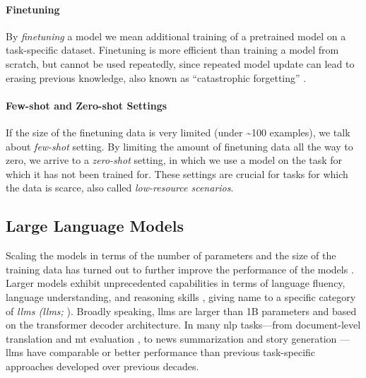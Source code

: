 {\begin{figure}[t]
\end{figure}

\paragraph{Finetuning} By \emph{finetuning} a model we mean additional training of a pretrained model on a task-specific dataset. Finetuning is more efficient than training a model from scratch, but cannot be used repeatedly, since repeated model update can lead to erasing previous knowledge, also known as ``catastrophic forgetting'' \cite{mccloskey1989catastrophic,kirkpatrick2017overcoming}.


\paragraph{Few-shot and Zero-shot Settings} If the size of the finetuning data is very limited (under \textasciitilde 100 examples), we talk about \emph{few-shot} setting. By limiting the amount of finetuning data all the way to zero, we arrive to a \emph{zero-shot} setting, in which we use a model on the task for which it has not been trained for. These settings are crucial for tasks for which the data is scarce, also called \emph{low-resource scenarios}.

\subsection{Large Language Models}
\label{sec:llms}
Scaling the models in terms of the number of parameters and the size of the training data has turned out to further improve the performance of the models \cite{kaplan2020scaling,hoffmann2022training}. Larger models exhibit unprecedented capabilities in terms of language fluency, language understanding, and reasoning skills \cite{wei2022emergent,bubeck2023sparks}, giving name to a specific category of \emph{\aclp{llm} (\acsp{llm};} \citealp{brown2020language,zhao2023survey}). Broadly speaking, \acp{llm} are larger than 1B parameters and based on the transformer decoder architecture. In many \ac{nlp} tasks---from document-level translation \cite{wang2023documentlevel} and \ac{mt} evaluation \cite{kocmiLargeLanguageModels2023}, to news summarization \cite{zhang2024benchmarking} and story generation \cite{xie2023next}---\acp{llm} have comparable or better performance than previous task-specific approaches developed over previous decades.

}
